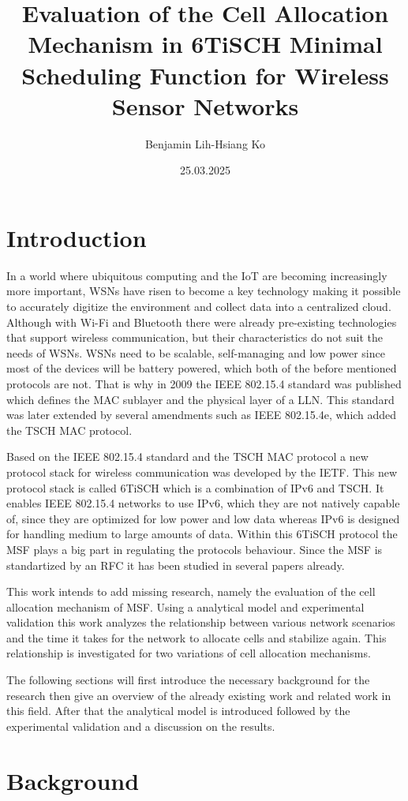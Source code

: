 \documentclass{comnets-thesis}
\title{Evaluation of the Cell Allocation Mechanism in 6TiSCH Minimal Scheduling Function for Wireless Sensor Networks}
\author{Benjamin Lih-Hsiang Ko}
\date{25.03.2025}
\begin{document}
\maketitlepage

\chapter{Introduction}\label{chp:introduction}
In a world where ubiquitous computing and the \ac{IoT} are becoming increasingly more important, \acp{WSN} have risen to become a key technology making it possible to accurately digitize the environment and collect data into a centralized cloud. Although with Wi-Fi and Bluetooth there were already pre-existing technologies that support wireless communication, but their characteristics do not suit the needs of WSNs. WSNs need to be scalable, self-managing and low power since most of the devices will be battery powered, which both of the before mentioned protocols are not. That is why in 2009 the IEEE 802.15.4 standard \cite{IEEE802} was published which defines the \ac{MAC} sublayer and the physical layer of a \ac{LLN}. This standard was later extended by several amendments such as IEEE 802.15.4e, which added the \ac{TSCH} \ac{MAC} protocol.

Based on the IEEE 802.15.4 standard and the \ac{TSCH} \ac{MAC} protocol a new protocol stack for wireless communication was developed by the IETF. This new protocol stack is called \ac{6TiSCH} which is a combination of IPv6 and TSCH. It enables IEEE 802.15.4 networks to use IPv6, which they are not natively capable of, since they are optimized for low power and low data whereas IPv6 is designed for handling medium to large amounts of data. Within this \ac{6TiSCH} protocol the \acf{MSF} plays a big part in regulating the protocols behaviour. Since the MSF is standartized by an RFC it has been studied in several papers already. 

This work intends to add missing research, namely the evaluation of the cell allocation mechanism of \ac{MSF}. Using a analytical model and experimental validation this work analyzes the relationship between various network scenarios and the time it takes for the network to allocate cells and stabilize again. This relationship is investigated for two variations of cell allocation mechanisms.

The following sections will first introduce the necessary background for the research then give an overview of the already existing work and related work in this field. After that the analytical model is introduced followed by the experimental validation and a discussion on the results.


\chapter{Background}\label{chp:background}
\end{document}
